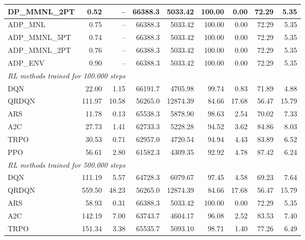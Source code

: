 \begin{samepage}
\begin{center}
\begin{tabular}{l|rr|rr|rr|rr}
    DP\_MMNL\_2PT &     0.52 &    -- &    66388.3 &    5033.42 &  100.00 &    0.00 &   72.29 &    5.35 \\
    \midrule
    ADP\_MNL     &     0.75 &    -- &    66388.3 &    5033.42 &  100.00 &    0.00 &   72.29 &    5.35 \\
    ADP\_MMNL\_5PT &     0.74 &    -- &    66388.3 &    5033.42 &  100.00 &    0.00 &   72.29 &    5.35 \\
    ADP\_MMNL\_2PT &     0.76 &    -- &    66388.3 &    5033.42 &  100.00 &    0.00 &   72.29 &    5.35 \\
    ADP\_ENV     &     0.90 &    -- &    66388.3 &    5033.42 &  100.00 &    0.00 &   72.29 &    5.35 \\
    \midrule
    \multicolumn{9}{l}{\textit{RL methods trained for 100.000 steps}} \\
    \midrule
    DQN          &    22.00 &     1.15 &    66191.7 &    4705.98 &   99.74 &    0.83 &   71.89 &    4.88 \\
    QRDQN        &   111.97 &    10.58 &    56265.0 &   12874.39 &   84.66 &   17.68 &   56.47 &   15.79 \\
    ARS          &    11.78 &     0.13 &    65538.3 &    5878.90 &   98.63 &    2.54 &   70.02 &    7.33 \\
    A2C          &    27.73 &     1.41 &    62733.3 &    5228.28 &   94.52 &    3.62 &   84.86 &    8.03 \\
    TRPO         &    30.53 &     0.71 &    62957.0 &    4720.54 &   94.94 &    4.43 &   83.89 &    6.52 \\
    PPO          &    56.61 &     2.80 &    61582.3 &    4309.35 &   92.92 &    4.78 &   87.42 &    6.24 \\
    \midrule
    \multicolumn{9}{l}{\textit{RL methods trained for 500.000 steps}} \\
    \midrule
    DQN          &   111.19 &     5.57 &    64728.3 &    6079.67 &   97.45 &    4.58 &   69.23 &    7.64 \\
    QRDQN        &   559.50 &    48.23 &    56265.0 &   12874.39 &   84.66 &   17.68 &   56.47 &   15.79 \\
    ARS          &    58.93 &     0.31 &    66388.3 &    5033.42 &  100.00 &    0.00 &   72.29 &    5.35 \\
    A2C          &   142.19 &     7.00 &    63743.7 &    4604.17 &   96.08 &    2.52 &   83.53 &    7.40 \\
    TRPO         &   151.34 &     3.38 &    65535.7 &    5093.10 &   98.71 &    1.40 &   77.26 &    6.49 \\

\end{tabular}
\end{center}
\end{samepage}
